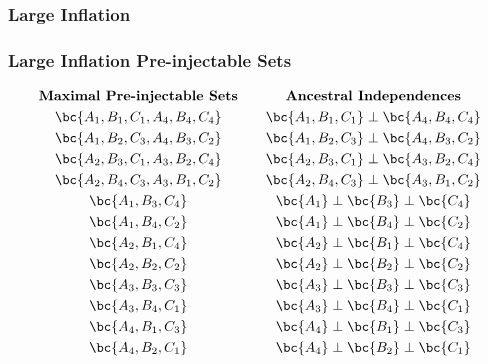 \documentclass[
    hyperref={bookmarks=false},%
    xcolor={dvipsnames},
]{beamer}
\begin{document}
\begin{frame}
    \frametitle{Large Inflation}
    \begin{center}
        \scalebox{0.8}{}
    \end{center}
\end{frame}

\begin{frame}
    \frametitle{Large Inflation Pre-injectable Sets}
    \begin{equation*}
        \begin{gathered}
            \textbf{Maximal Pre-injectable Sets} \\
            \bc{A_1, B_1, C_1, A_4, B_4, C_4} \\
            \bc{A_1, B_2, C_3, A_4, B_3, C_2} \\
            \bc{A_2, B_3, C_1, A_3, B_2, C_4} \\
            \bc{A_2, B_4, C_3, A_3, B_1, C_2} \\
            \bc{A_1, B_3, C_4} \\
            \bc{A_1, B_4, C_2} \\
            \bc{A_2, B_1, C_4} \\
            \bc{A_2, B_2, C_2} \\
            \bc{A_3, B_3, C_3} \\
            \bc{A_3, B_4, C_1} \\
            \bc{A_4, B_1, C_3} \\
            \bc{A_4, B_2, C_1}
        \end{gathered}
        \qquad
        \begin{gathered}
            \textbf{Ancestral Independences} \\
            \bc{A_1, B_1, C_1} \ancestralindep \bc{A_4, B_4, C_4} \\
            \bc{A_1, B_2, C_3} \ancestralindep \bc{A_4, B_3, C_2} \\
            \bc{A_2, B_3, C_1} \ancestralindep \bc{A_3, B_2, C_4} \\
            \bc{A_2, B_4, C_3} \ancestralindep \bc{A_3, B_1, C_2} \\
            \bc{A_1} \ancestralindep \bc{B_3} \ancestralindep \bc{C_4} \\
            \bc{A_1} \ancestralindep \bc{B_4} \ancestralindep \bc{C_2} \\
            \bc{A_2} \ancestralindep \bc{B_1} \ancestralindep \bc{C_4} \\
            \bc{A_2} \ancestralindep \bc{B_2} \ancestralindep \bc{C_2} \\
            \bc{A_3} \ancestralindep \bc{B_3} \ancestralindep \bc{C_3} \\
            \bc{A_3} \ancestralindep \bc{B_4} \ancestralindep \bc{C_1} \\
            \bc{A_4} \ancestralindep \bc{B_1} \ancestralindep \bc{C_3} \\
            \bc{A_4} \ancestralindep \bc{B_2} \ancestralindep \bc{C_1}
        \end{gathered}
    \end{equation*}
\end{frame}
\end{document}
